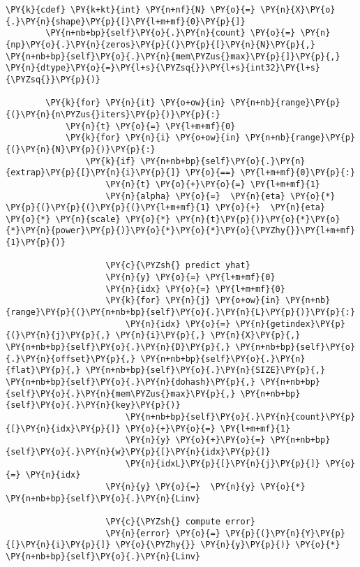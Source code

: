 \begin{Verbatim}[commandchars=\\\{\}]
        \PY{k}{cdef} \PY{k+kt}{int} \PY{n+nf}{N} \PY{o}{=} \PY{n}{X}\PY{o}{.}\PY{n}{shape}\PY{p}{[}\PY{l+m+mf}{0}\PY{p}{]}
        \PY{n+nb+bp}{self}\PY{o}{.}\PY{n}{count} \PY{o}{=} \PY{n}{np}\PY{o}{.}\PY{n}{zeros}\PY{p}{(}\PY{p}{[}\PY{n}{N}\PY{p}{,} \PY{n+nb+bp}{self}\PY{o}{.}\PY{n}{mem\PYZus{}max}\PY{p}{]}\PY{p}{,} \PY{n}{dtype}\PY{o}{=}\PY{l+s}{\PYZsq{}}\PY{l+s}{int32}\PY{l+s}{\PYZsq{}}\PY{p}{)}

        \PY{k}{for} \PY{n}{it} \PY{o+ow}{in} \PY{n+nb}{range}\PY{p}{(}\PY{n}{n\PYZus{}iters}\PY{p}{)}\PY{p}{:}
            \PY{n}{t} \PY{o}{=} \PY{l+m+mf}{0}
            \PY{k}{for} \PY{n}{i} \PY{o+ow}{in} \PY{n+nb}{range}\PY{p}{(}\PY{n}{N}\PY{p}{)}\PY{p}{:}
                \PY{k}{if} \PY{n+nb+bp}{self}\PY{o}{.}\PY{n}{extrap}\PY{p}{[}\PY{n}{i}\PY{p}{]} \PY{o}{==} \PY{l+m+mf}{0}\PY{p}{:}
                    \PY{n}{t} \PY{o}{+}\PY{o}{=} \PY{l+m+mf}{1}
                    \PY{n}{alpha} \PY{o}{=}  \PY{n}{eta} \PY{o}{*} \PY{p}{(}\PY{p}{(}\PY{p}{(}\PY{l+m+mf}{1} \PY{o}{+}  \PY{n}{eta} \PY{o}{*} \PY{n}{scale} \PY{o}{*} \PY{n}{t}\PY{p}{)}\PY{o}{*}\PY{o}{*}\PY{n}{power}\PY{p}{)}\PY{o}{*}\PY{o}{*}\PY{o}{\PYZhy{}}\PY{l+m+mf}{1}\PY{p}{)}

                    \PY{c}{\PYZsh{} predict yhat}
                    \PY{n}{y} \PY{o}{=} \PY{l+m+mf}{0}
                    \PY{n}{idx} \PY{o}{=} \PY{l+m+mf}{0} 
                    \PY{k}{for} \PY{n}{j} \PY{o+ow}{in} \PY{n+nb}{range}\PY{p}{(}\PY{n+nb+bp}{self}\PY{o}{.}\PY{n}{L}\PY{p}{)}\PY{p}{:} 
                        \PY{n}{idx} \PY{o}{=} \PY{n}{getindex}\PY{p}{(}\PY{n}{j}\PY{p}{,} \PY{n}{i}\PY{p}{,} \PY{n}{X}\PY{p}{,} \PY{n+nb+bp}{self}\PY{o}{.}\PY{n}{D}\PY{p}{,} \PY{n+nb+bp}{self}\PY{o}{.}\PY{n}{offset}\PY{p}{,} \PY{n+nb+bp}{self}\PY{o}{.}\PY{n}{flat}\PY{p}{,} \PY{n+nb+bp}{self}\PY{o}{.}\PY{n}{SIZE}\PY{p}{,} \PY{n+nb+bp}{self}\PY{o}{.}\PY{n}{dohash}\PY{p}{,} \PY{n+nb+bp}{self}\PY{o}{.}\PY{n}{mem\PYZus{}max}\PY{p}{,} \PY{n+nb+bp}{self}\PY{o}{.}\PY{n}{key}\PY{p}{)}
                        \PY{n+nb+bp}{self}\PY{o}{.}\PY{n}{count}\PY{p}{[}\PY{n}{idx}\PY{p}{]} \PY{o}{+}\PY{o}{=} \PY{l+m+mf}{1}
                        \PY{n}{y} \PY{o}{+}\PY{o}{=} \PY{n+nb+bp}{self}\PY{o}{.}\PY{n}{w}\PY{p}{[}\PY{n}{idx}\PY{p}{]}
                        \PY{n}{idxL}\PY{p}{[}\PY{n}{j}\PY{p}{]} \PY{o}{=} \PY{n}{idx}
                    \PY{n}{y} \PY{o}{=}  \PY{n}{y} \PY{o}{*} \PY{n+nb+bp}{self}\PY{o}{.}\PY{n}{Linv}

                    \PY{c}{\PYZsh{} compute error}
                    \PY{n}{error} \PY{o}{=} \PY{p}{(}\PY{n}{Y}\PY{p}{[}\PY{n}{i}\PY{p}{]} \PY{o}{\PYZhy{}} \PY{n}{y}\PY{p}{)} \PY{o}{*} \PY{n+nb+bp}{self}\PY{o}{.}\PY{n}{Linv}


\end{Verbatim}
